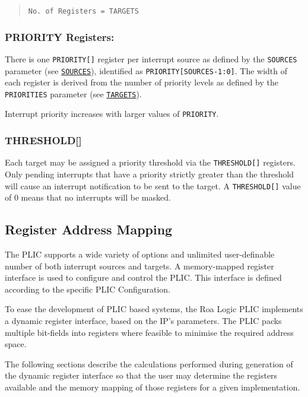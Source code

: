 \begin{quote}
\texttt{No.\ of\ Registers\ =\ TARGETS}
\end{quote}

\subsubsection{PRIORITY Registers:}

There is one \texttt{PRIORITY[]} register per interrupt source as defined by the \texttt{SOURCES} parameter (see \protect\hyperlink{SOURCES}{\texttt{SOURCES}}), identified as \texttt{PRIORITY[SOURCES-1:0]}.
The width of each register is derived from the number of priority levels as defined by the \texttt{PRIORITIES} parameter (see \protect\hyperlink{TARGETS}{\texttt{TARGETS}}).

Interrupt priority increases with larger values of \texttt{PRIORITY}.

\subsubsection{THRESHOLD[]}

Each target may be assigned a priority threshold via the \texttt{THRESHOLD[]} registers.
Only pending interrupts that have a priority strictly greater than the threshold will cause an interrupt notification to be sent to the target.
A \texttt{THRESHOLD[]} value of 0 means that no interrupts will be masked.

\subsection{Register Address Mapping}

The PLIC supports a wide variety of options and unlimited user-definable number of both interrupt sources and targets. A memory-mapped register interface is used to configure and control the PLIC. This interface is defined according to the specific PLIC Configuration.

To ease the development of PLIC based systems, the Roa Logic PLIC implements a dynamic register interface, based on the IP's parameters.
The PLIC packs multiple bit-fields into registers where feasible to minimise the required address space.

The following sections describe the calculations performed during generation of the dynamic register interface so that the user may
determine the registers available and the memory mapping of those registers for a given implementation.

